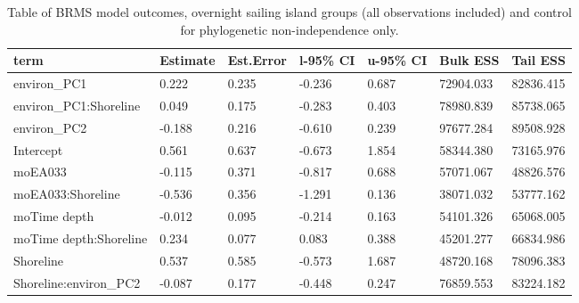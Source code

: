 \begin{table}[ht]
\centering
\begin{tabular}{p{5cm}p{2cm}p{2cm}p{2cm}p{2cm}p{2cm}p{2cm}}
  \toprule
term & Estimate & Est.Error & l-95\% CI & u-95\% CI & Bulk ESS & Tail ESS \\ 
  \midrule
environ\_PC1 & 0.222 & 0.235 & -0.236 & 0.687 & 72904.033 & 82836.415 \\ 
  environ\_PC1:Shoreline & 0.049 & 0.175 & -0.283 & 0.403 & 78980.839 & 85738.065 \\ 
  environ\_PC2 & -0.188 & 0.216 & -0.610 & 0.239 & 97677.284 & 89508.928 \\ 
  Intercept & 0.561 & 0.637 & -0.673 & 1.854 & 58344.380 & 73165.976 \\ 
  moEA033 & -0.115 & 0.371 & -0.817 & 0.688 & 57071.067 & 48826.576 \\ 
  moEA033:Shoreline & -0.536 & 0.356 & -1.291 & 0.136 & 38071.032 & 53777.162 \\ 
  moTime depth & -0.012 & 0.095 & -0.214 & 0.163 & 54101.326 & 65068.005 \\ 
  moTime depth:Shoreline & 0.234 & 0.077 & 0.083 & 0.388 & 45201.277 & 66834.986 \\ 
  Shoreline & 0.537 & 0.585 & -0.573 & 1.687 & 48720.168 & 78096.383 \\ 
  Shoreline:environ\_PC2 & -0.087 & 0.177 & -0.448 & 0.247 & 76859.553 & 83224.182 \\ 
   \bottomrule
\end{tabular}
\caption{Table of BRMS model outcomes, overnight sailing island groups (all observations included) and control for phylogenetic non-independence only.} 
\label{BRMS_effects_SBZR_control_none}
\end{table}
